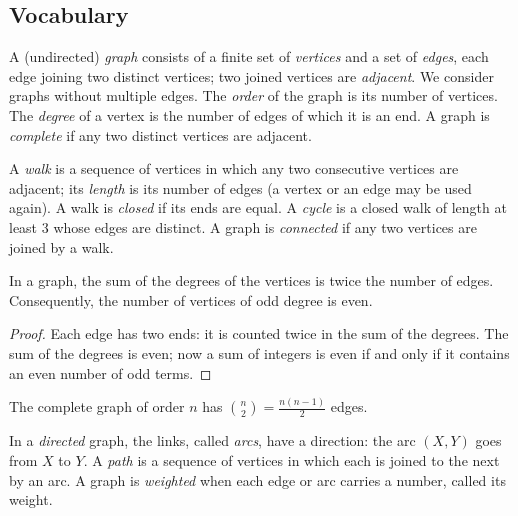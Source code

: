 \subsection{Vocabulary}
\begin{definition}[Graph]
A (undirected) \emph{graph} consists of a finite set of \emph{vertices} and a set of \emph{edges}, each edge joining two distinct vertices; two joined vertices are \emph{adjacent}. We consider graphs without multiple edges. The \emph{order} of the graph is its number of vertices. The \emph{degree} of a vertex is the number of edges of which it is an end. A graph is \emph{complete} if any two distinct vertices are adjacent.
\end{definition}
\begin{definition}
A \emph{walk} is a sequence of vertices in which any two consecutive vertices are adjacent; its \emph{length} is its number of edges (a vertex or an edge may be used again). A walk is \emph{closed} if its ends are equal. A \emph{cycle} is a closed walk of length at least $3$ whose edges are distinct. A graph is \emph{connected} if any two vertices are joined by a walk.
\end{definition}
\begin{figurebox}
\end{figurebox}
\begin{theorem}
In a graph, the sum of the degrees of the vertices is twice the number of edges. Consequently, the number of vertices of odd degree is even.
\end{theorem}
\begin{proof}
Each edge has two ends: it is counted twice in the sum of the degrees. The sum of the degrees is even; now a sum of integers is even if and only if it contains an even number of odd terms.
\end{proof}
\begin{theorem}
The complete graph of order $n$ has $\binom n2=\frac{n(n-1)}2$ edges.
\end{theorem}
\begin{definition}
In a \emph{directed} graph, the links, called \emph{arcs}, have a direction: the arc $(X,Y)$ goes from $X$ to $Y$. A \emph{path} is a sequence of vertices in which each is joined to the next by an arc. A graph is \emph{weighted} when each edge or arc carries a number, called its weight.
\end{definition}

